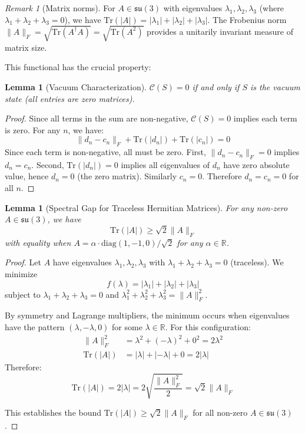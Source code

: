 \documentclass[11pt]{article}
\numberwithin{equation}{section}
\newtheorem{lemma}[theorem]{Lemma}
\theoremstyle{definition}
\theoremstyle{remark}
\newtheorem{remark}[theorem]{Remark}
\begin{document}
\begin{remark}[Matrix norms]
For $A \in \mathfrak{su}(3)$ with eigenvalues $\lambda_1, \lambda_2, \lambda_3$ (where $\lambda_1 + \lambda_2 + \lambda_3 = 0$), we have $\text{Tr}(|A|) = |\lambda_1| + |\lambda_2| + |\lambda_3|$. The Frobenius norm $\|A\|_F = \sqrt{\text{Tr}(A^\dagger A)} = \sqrt{\text{Tr}(A^2)}$ provides a unitarily invariant measure of matrix size.
\end{remark}

This functional has the crucial property:

\begin{lemma}[Vacuum Characterization]
\label{lem:vacuum}
$\mathcal{C}(S) = 0$ if and only if $S$ is the vacuum state (all entries are zero matrices).
\end{lemma}

\begin{proof}
Since all terms in the sum are non-negative, $\mathcal{C}(S) = 0$ implies each term is zero. For any $n$, we have:
\[\|d_n - c_n\|_F + \text{Tr}(|d_n|) + \text{Tr}(|c_n|) = 0\]
Since each term is non-negative, all must be zero. First, $\|d_n - c_n\|_F = 0$ implies $d_n = c_n$. Second, $\text{Tr}(|d_n|) = 0$ implies all eigenvalues of $d_n$ have zero absolute value, hence $d_n = 0$ (the zero matrix). Similarly $c_n = 0$. Therefore $d_n = c_n = 0$ for all $n$.
\end{proof}

\begin{lemma}[Spectral Gap for Traceless Hermitian Matrices]
\label{lem:spectral-gap}
For any non-zero $A \in \mathfrak{su}(3)$, we have
\begin{equation}
\text{Tr}(|A|) \geq \sqrt{2} \|A\|_F
\end{equation}
with equality when $A = \alpha \cdot \text{diag}(1,-1,0)/\sqrt{2}$ for any $\alpha \in \mathbb{R}$.
\end{lemma}

\begin{proof}
Let $A$ have eigenvalues $\lambda_1, \lambda_2, \lambda_3$ with $\lambda_1 + \lambda_2 + \lambda_3 = 0$ (traceless). We minimize
\begin{equation}
f(\lambda) = |\lambda_1| + |\lambda_2| + |\lambda_3|
\end{equation}
subject to $\lambda_1 + \lambda_2 + \lambda_3 = 0$ and $\lambda_1^2 + \lambda_2^2 + \lambda_3^2 = \|A\|_F^2$.

By symmetry and Lagrange multipliers, the minimum occurs when eigenvalues have the pattern $(\lambda, -\lambda, 0)$ for some $\lambda \in \mathbb{R}$. For this configuration:
\begin{align}
\|A\|_F^2 &= \lambda^2 + (-\lambda)^2 + 0^2 = 2\lambda^2 \\
\text{Tr}(|A|) &= |\lambda| + |-\lambda| + 0 = 2|\lambda|
\end{align}
Therefore:
\begin{equation}
\text{Tr}(|A|) = 2|\lambda| = 2\sqrt{\frac{\|A\|_F^2}{2}} = \sqrt{2}\|A\|_F
\end{equation}

This establishes the bound $\text{Tr}(|A|) \geq \sqrt{2}\|A\|_F$ for all non-zero $A \in \mathfrak{su}(3)$.
\end{proof}
\end{document}
